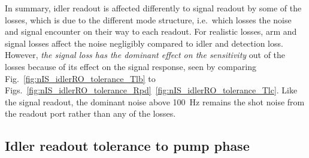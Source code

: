 In summary, idler readout is affected differently to signal readout by some of the losses, which is due to the different mode structure, i.e.\ which losses the noise and signal encounter on their way to each readout.
For realistic losses, arm and signal losses affect the noise negligibly compared to idler and detection loss. However, \emph{the signal loss has the dominant effect on the sensitivity} out of the losses because of its effect on the signal response, seen by comparing Fig.~\ref{fig:nIS_idlerRO_tolerance_Tlb} to Figs.~\ref{fig:nIS_idlerRO_tolerance_Rpd}~\ref{fig:nIS_idlerRO_tolerance_Tlc}. Like the signal readout, the dominant noise above 100~Hz remains the shot noise from the readout port rather than any of the losses.



\subsection{Idler readout tolerance to pump phase}
\label{sec:idlerRO_pump_phase}

